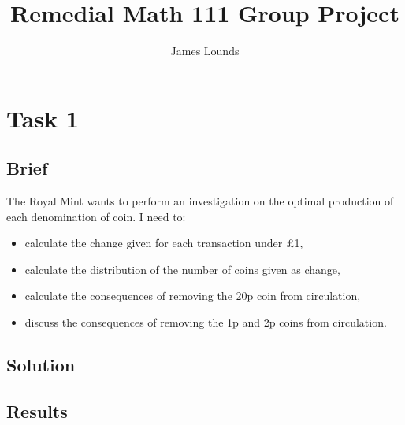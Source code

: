 \documentclass{article}
\author{James Lounds}
\title{Remedial Math 111 Group Project}
\begin{document}
\maketitle
\newpage

\section{Task 1}
\subsection{Brief}
The Royal Mint wants to perform an investigation on the optimal production of each denomination of coin.
\newline
I need to:
\begin{itemize}
    \item calculate the change given for each transaction under £1,

    \item calculate the distribution of the number of coins given as change,
    \item calculate the consequences of removing the 20p coin from circulation,
    \item discuss the consequences of removing the 1p and 2p coins from circulation.
\end{itemize}
\subsection{Solution}
\subsection{Results}
\end{document}
